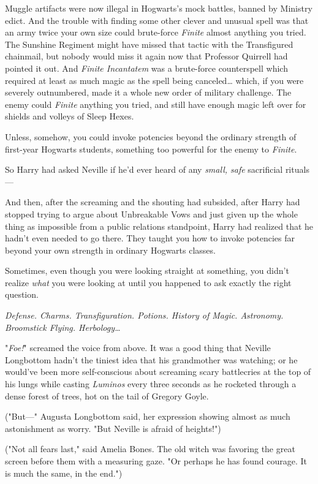 Muggle artifacts were now illegal in Hogwarts's mock battles, banned by 
Ministry edict. And the trouble with finding some other clever and unusual 
spell was that an army twice your own size could brute-force \emph{Finite} 
almost anything you tried. The Sunshine Regiment might have missed that tactic 
with the Transfigured chainmail, but nobody would miss it again now that 
Professor Quirrell had pointed it out. And \emph{Finite Incantatem} was a 
brute-force counterspell which required at least as much magic as the spell 
being canceled{\ldots} which, if you were severely outnumbered, made it a whole 
new order of military challenge. The enemy could \emph{Finite} anything you 
tried, and still have enough magic left over for shields and volleys of Sleep 
Hexes.

Unless, somehow, you could invoke potencies beyond the ordinary strength of 
first-year Hogwarts students, something too powerful for the enemy to 
\emph{Finite}.

So Harry had asked Neville if he'd ever heard of any \emph{small, safe} 
sacrificial rituals---

And then, after the screaming and the shouting had subsided, after Harry had 
stopped trying to argue about Unbreakable Vows and just given up the whole 
thing as impossible from a public relations standpoint, Harry had realized that 
he hadn't even needed to go there. They taught you how to invoke potencies far 
beyond your own strength in ordinary Hogwarts classes.

Sometimes, even though you were looking straight at something, you didn't 
realize \emph{what} you were looking at until you happened to ask exactly the 
right question.

\emph{Defense. Charms. Transfiguration. Potions. History of Magic. Astronomy. 
Broomstick Flying. Herbology{\ldots}}

"\emph{Foe!}" screamed the voice from above.
\sbreak
It was a good thing that Neville Longbottom hadn't the tiniest idea that his 
grandmother was watching; or he would've been more self-conscious about 
screaming scary battlecries at the top of his lungs while casting 
\emph{Luminos} every three seconds as he rocketed through a dense forest of 
trees, hot on the tail of Gregory Goyle.

("But---" Augusta Longbottom said, her expression showing almost as much 
astonishment as worry. "But Neville is afraid of heights!")

("Not all fears last," said Amelia Bones. The old witch was favoring the great 
screen before them with a measuring gaze. "Or perhaps he has found courage. It 
is much the same, in the end.")

